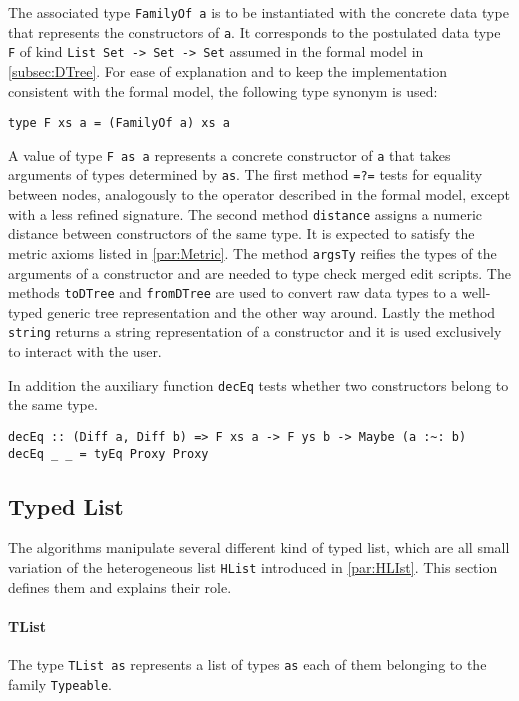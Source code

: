 \documentclass[../Thesis.tex]{subfiles}
\begin{document}
	The associated type \texttt{FamilyOf a} is to be instantiated with the 
	concrete data type that represents the constructors of \texttt{a}.
	It corresponds to the postulated data type \texttt{F} of kind
	\texttt{List Set -> Set -> Set} assumed in the formal model in 
	\ref{subsec:DTree}.
	For ease of explanation and to keep the implementation consistent 
	with the formal model, the following type synonym is used:
\begin{verbatim}
type F xs a = (FamilyOf a) xs a
\end{verbatim}
	A value of type \texttt{F as a} represents a concrete constructor
	of \texttt{a} that takes arguments of types determined 
	by \texttt{as}.
	The first method \texttt{=?=} tests for equality between nodes, analogously
	to the operator described in the formal model, except with a less 
	refined signature.
	The second method \texttt{distance} assigns a numeric distance
	between constructors of the same type. 
	It is expected to satisfy the metric axioms listed in \ref{par:Metric}.
	The method \texttt{argsTy} reifies the types of the arguments of a 
	constructor and are needed to type check merged edit scripts.
	The methods \texttt{toDTree} and \texttt{fromDTree} are used to convert
	raw data types to a well-typed generic tree representation
	and the other way around.
	Lastly the method \texttt{string} returns a string representation of a
	constructor and it is used exclusively to interact with the user.
		
	In addition the auxiliary function \texttt{decEq} tests whether
	two constructors belong to the same type.
	
\begin{verbatim}
decEq :: (Diff a, Diff b) => F xs a -> F ys b -> Maybe (a :~: b)
decEq _ _ = tyEq Proxy Proxy
\end{verbatim}

	\subsection{Typed List}		
	The algorithms manipulate several different kind of typed list,
	which are all small variation of the heterogeneous list \texttt{HList} 
	introduced in \ref{par:HLIst}. This section defines them and explains their 
	role.
	
	\paragraph{TList}
	The type \texttt{TList as} represents a list of types \texttt{as} each 
	of them belonging to the family \texttt{Typeable}.
\end{document}
